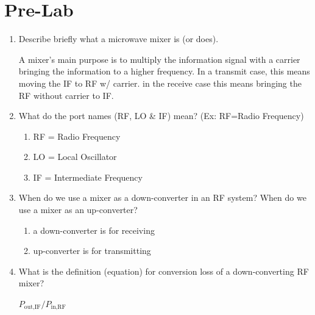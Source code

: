 \documentclass[journal]{IEEEtran}
\begin{document}
\section{Pre-Lab}
\begin{enumerate}
    \item Describe briefly what a microwave mixer is (or does).

          A mixer's main purpose is to multiply the information signal with a
          carrier bringing the information to a higher frequency. In a transmit
          case, this means moving the IF to RF w/ carrier. in the receive case
          this means bringing the RF without carrier to IF.

    \item What do the port names (RF, LO \& IF) mean? (Ex: RF=Radio Frequency)
          \begin{enumerate}
              \item RF = Radio Frequency
              \item LO = Local Oscillator
              \item IF = Intermediate Frequency
          \end{enumerate}
    \item When do we use a mixer as a down-converter in an RF system? When do we use a mixer as an up-converter?
          \begin{enumerate}
              \item a down-converter is for  receiving
              \item up-converter is for transmitting
          \end{enumerate}
    \item What is the definition (equation) for conversion loss of a down-converting RF mixer?

          \(P_{\text{out,IF}}/P_{\text{in,RF}}\)
\end{enumerate}

\end{document}
